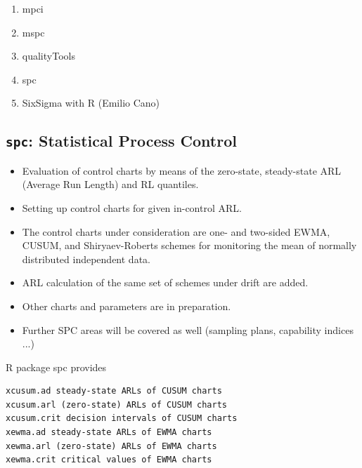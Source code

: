 \documentclass[]{report}
\begin{document}
\begin{enumerate}
\item mpci
\item mspc
\item qualityTools
\item spc
\item SixSigma with R (Emilio Cano)
\end{enumerate}


\newpage
\subsection{ \texttt{spc}: Statistical Process Control }


\begin{itemize}
\item Evaluation of control charts by means of the zero-state, steady-state ARL (Average Run Length) and RL quantiles. 

\item Setting up control charts for given in-control ARL. 

\item The control charts under consideration are one- and two-sided EWMA, CUSUM, and Shiryaev-Roberts schemes for monitoring the mean of normally distributed independent data. 

\item
ARL calculation of the same set of schemes under drift are added. 

\item Other charts and parameters are in preparation. 

\item Further SPC areas will be covered as well (sampling plans, capability indices ...)
\end{itemize}


R package spc provides

\begin{verbatim}
xcusum.ad steady-state ARLs of CUSUM charts
xcusum.arl (zero-state) ARLs of CUSUM charts
xcusum.crit decision intervals of CUSUM charts
xewma.ad steady-state ARLs of EWMA charts
xewma.arl (zero-state) ARLs of EWMA charts
xewma.crit critical values of EWMA charts
\end{verbatim}
\end{document}
